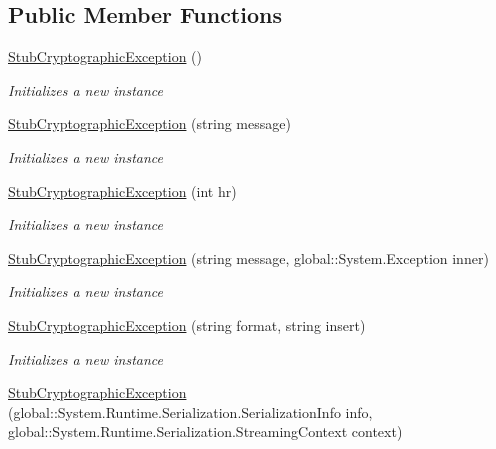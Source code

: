 \subsection*{Public Member Functions}
\begin{DoxyCompactItemize}
\item 
\hyperlink{class_system_1_1_security_1_1_cryptography_1_1_fakes_1_1_stub_cryptographic_exception_a92add08bd0dfcff1f615cfc5a027e7e1}{Stub\-Cryptographic\-Exception} ()
\begin{DoxyCompactList}\small\item\em Initializes a new instance\end{DoxyCompactList}\item 
\hyperlink{class_system_1_1_security_1_1_cryptography_1_1_fakes_1_1_stub_cryptographic_exception_ae426195b4642ea5d674a8910de4ace2f}{Stub\-Cryptographic\-Exception} (string message)
\begin{DoxyCompactList}\small\item\em Initializes a new instance\end{DoxyCompactList}\item 
\hyperlink{class_system_1_1_security_1_1_cryptography_1_1_fakes_1_1_stub_cryptographic_exception_a9530748bbcdd606e01e72e46a24d859a}{Stub\-Cryptographic\-Exception} (int hr)
\begin{DoxyCompactList}\small\item\em Initializes a new instance\end{DoxyCompactList}\item 
\hyperlink{class_system_1_1_security_1_1_cryptography_1_1_fakes_1_1_stub_cryptographic_exception_abfb285b6a0efb44e0ab7c577dc949e1f}{Stub\-Cryptographic\-Exception} (string message, global\-::\-System.\-Exception inner)
\begin{DoxyCompactList}\small\item\em Initializes a new instance\end{DoxyCompactList}\item 
\hyperlink{class_system_1_1_security_1_1_cryptography_1_1_fakes_1_1_stub_cryptographic_exception_a292bebc16d4899a06efd455f425b7997}{Stub\-Cryptographic\-Exception} (string format, string insert)
\begin{DoxyCompactList}\small\item\em Initializes a new instance\end{DoxyCompactList}\item 
\hyperlink{class_system_1_1_security_1_1_cryptography_1_1_fakes_1_1_stub_cryptographic_exception_a4ffbe04e25c43de652e193b79e7120c8}{Stub\-Cryptographic\-Exception} (global\-::\-System.\-Runtime.\-Serialization.\-Serialization\-Info info, global\-::\-System.\-Runtime.\-Serialization.\-Streaming\-Context context)

\end{DoxyCompactItemize}
